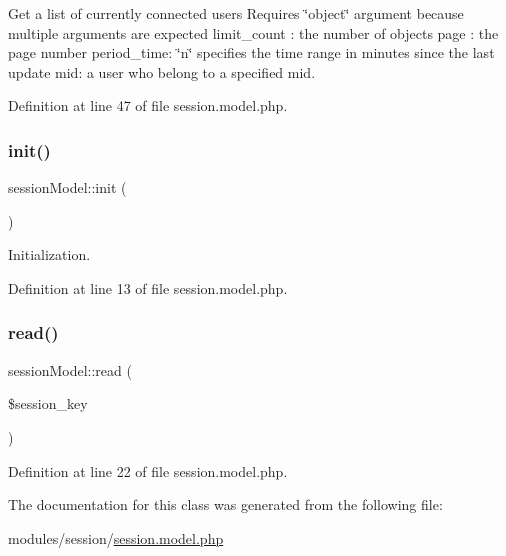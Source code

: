 Get a list of currently connected users Requires \char`\"{}object\char`\"{} argument because multiple arguments are expected limit\+\_\+count \+: the number of objects page \+: the page number period\+\_\+time\+: \char`\"{}n\char`\"{} specifies the time range in minutes since the last update mid\+: a user who belong to a specified mid. 



Definition at line 47 of file session.\+model.\+php.

\mbox{\label{classsessionModel_a860d5067061beadd0bc15d57df695dd8}} 
\subsubsection{\texorpdfstring{init()}{init()}}
{\footnotesize\ttfamily session\+Model\+::init (\begin{DoxyParamCaption}{ }\end{DoxyParamCaption})}



Initialization. 



Definition at line 13 of file session.\+model.\+php.

\mbox{\label{classsessionModel_a1cae587d88bb84dc32c1c7b751b11528}} 
\subsubsection{\texorpdfstring{read()}{read()}}
{\footnotesize\ttfamily session\+Model\+::read (\begin{DoxyParamCaption}\item[{}]{\$session\+\_\+key }\end{DoxyParamCaption})}



Definition at line 22 of file session.\+model.\+php.



The documentation for this class was generated from the following file\+:\begin{DoxyCompactItemize}
\item 
modules/session/\hyperlink{session_8model_8php}{session.\+model.\+php}\end{DoxyCompactItemize}
